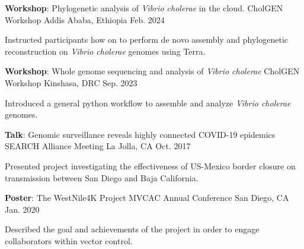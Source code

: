 
 \begin{cventries}
  \cventry
    {\textbf{Workshop}: Phylogenetic analysis of \textit{Vibrio cholerae} in the cloud.} %
    {CholGEN Workshop} %
    {Addis Ababa, Ethiopia} %
    {Feb. 2024} %
    {
      \begin{cvitems} %
        \item {Instructed participants how on to perform de novo assembly and phylogenetic reconstruction on \textit{Vibrio cholerae} genomes using Terra.}
      \end{cvitems}
    }
  
  \cventry
     {\textbf{Workshop}: Whole genome sequencing and analysis of \textit{Vibrio cholerae}} %
    {CholGEN Workshop} %
    {Kinshasa, DRC} %
    {Sep. 2023} %
    {
      \begin{cvitems} %
      \item {Introduced a general python workflow to assemble and analyze \textit{Vibrio cholerae} genomes.}
      \end{cvitems}
    }


  \cventry
    {\textbf{Talk}: Genomic surveillance reveals highly connected COVID-19 epidemics} %
    {SEARCH Alliance Meeting} %
    {La Jolla, CA} %
    {Oct. 2017} %
    {
      \begin{cvitems} %
        \item{Presented project investigating the effectiveness of US-Mexico border closure on transmission between San Diego and Baja California.}
      \end{cvitems}
    }
    
  \cventry
    {\textbf{Poster}: The WestNile4K Project} %
    {MVCAC Annual Conference} %
    {San Diego, CA} %
    {Jan. 2020} %
    {
      \begin{cvitems} %
        \item {Described the goal and achievements of the project in order to engage collaborators within vector control.}
      \end{cvitems}
    }


\end{cventries}

